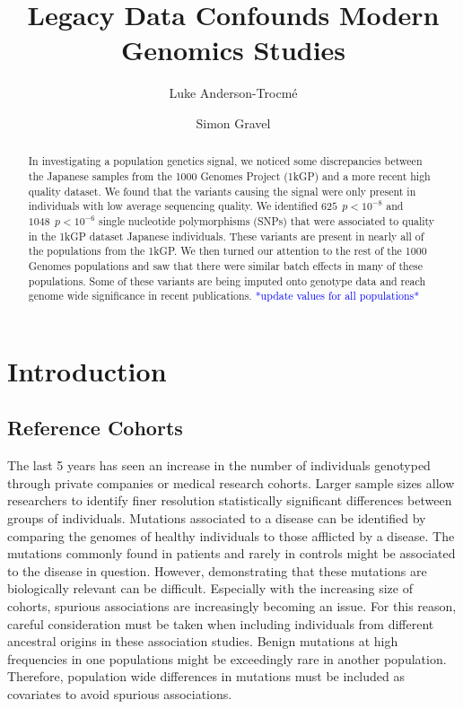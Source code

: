\documentclass[9pt,lineno]{elife}
\title{Legacy Data Confounds Modern Genomics Studies}
\author[1,2]{Luke Anderson-Trocm\'e}
\author[1,2]{Simon Gravel}
\affil[1]{Department of Human Genetics, McGill University, Montreal, QC H3A 0G1, Canada}
\affil[2]{McGill University and Genome Quebec Innovation Centre, Montreal, QC H3A 0G1, Canada}
\newcommand{\todo}[1]{\textcolor{blue}{*#1*}}
\begin{document}
\maketitle
\begin{abstract}
In investigating a population genetics signal, we noticed some discrepancies between the Japanese samples from the 1000 Genomes Project (1kGP) and a more recent high quality dataset.
We found that the variants causing the signal were only present in individuals with low average sequencing quality.
We identified $625\ \  p < 10^{-8}$ and $1048\ \ p < 10^{-6}$ single nucleotide polymorphisms (SNPs) that were associated to quality in the 1kGP dataset Japanese individuals.
These variants are present in nearly all of the populations from the 1kGP. 
We then turned our attention to the rest of the 1000 Genomes populations and saw that there were similar batch effects in many of these populations.
Some of these variants are being imputed onto genotype data and reach genome wide significance in recent publications.
\todo{update values for all populations}
\end{abstract}

			\section{Introduction}
	\subsection{Reference Cohorts}			
The last 5 years has seen an increase in the number of individuals genotyped through private companies or medical research cohorts. 
Larger sample sizes allow researchers to identify finer resolution statistically significant differences between groups of individuals. 
Mutations associated to a disease can be identified by comparing the genomes of healthy individuals to those afflicted by a disease. 
The mutations commonly found in patients and rarely in controls might be associated to the disease in question.
However, demonstrating that these mutations are biologically relevant can be difficult.
Especially with the increasing size of cohorts, spurious associations are increasingly becoming an issue. 
For this reason, careful consideration must be taken when including individuals from different ancestral origins in these association studies.
Benign mutations at high frequencies in one populations might be exceedingly rare in another population.
Therefore, population wide differences in mutations must be included as covariates to avoid spurious associations.
\end{document}
